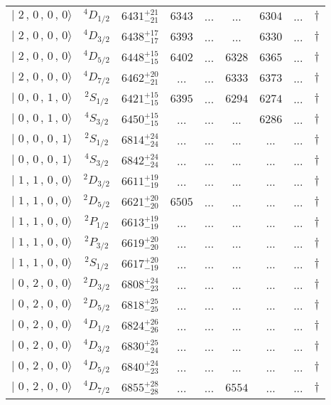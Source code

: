 \begin{tabular}{c c| c c c c c c c}
$\vert \,\,2\,,\,0\,,\,0\,,\,0 \rangle $ & $^{4}D_{1/2}$ & $6431^{+21}_{-21}$ & $6343$ & ... & ... & $6304$ & ... & $\dagger$ \\ 
$\vert \,\,2\,,\,0\,,\,0\,,\,0 \rangle $ & $^{4}D_{3/2}$ & $6438^{+17}_{-17}$ & $6393$ & ... & ... & $6330$ & ... & $\dagger$ \\ 
$\vert \,\,2\,,\,0\,,\,0\,,\,0 \rangle $ & $^{4}D_{5/2}$ & $6448^{+15}_{-15}$ & $6402$ & ... & $6328$ & $6365$ & ... & $\dagger$ \\ 
$\vert \,\,2\,,\,0\,,\,0\,,\,0 \rangle $ & $^{4}D_{7/2}$ & $6462^{+20}_{-21}$ & ... & ... & $6333$ & $6373$ & ... & $\dagger$ \\ 
$\vert \,\,0\,,\,0\,,\,1\,,\,0 \rangle $ & $^{2}S_{1/2}$ & $6421^{+15}_{-15}$ & $6395$ & ... & $6294$ & $6274$ & ... & $\dagger$ \\ 
$\vert \,\,0\,,\,0\,,\,1\,,\,0 \rangle $ & $^{4}S_{3/2}$ & $6450^{+15}_{-15}$ & ... & ... & ... & $6286$ & ... & $\dagger$ \\ 
$\vert \,\,0\,,\,0\,,\,0\,,\,1 \rangle $ & $^{2}S_{1/2}$ & $6814^{+24}_{-24}$ & ... & ... & ... & ... & ... & $\dagger$ \\ 
$\vert \,\,0\,,\,0\,,\,0\,,\,1 \rangle $ & $^{4}S_{3/2}$ & $6842^{+24}_{-24}$ & ... & ... & ... & ... & ... & $\dagger$ \\ 
$\vert \,\,1\,,\,1\,,\,0\,,\,0 \rangle $ & $^{2}D_{3/2}$ & $6611^{+19}_{-19}$ & ... & ... & ... & ... & ... & $\dagger$ \\ 
$\vert \,\,1\,,\,1\,,\,0\,,\,0 \rangle $ & $^{2}D_{5/2}$ & $6621^{+20}_{-20}$ & $6505$ & ... & ... & ... & ... & $\dagger$ \\ 
$\vert \,\,1\,,\,1\,,\,0\,,\,0 \rangle $ & $^{2}P_{1/2}$ & $6613^{+19}_{-19}$ & ... & ... & ... & ... & ... & $\dagger$ \\ 
$\vert \,\,1\,,\,1\,,\,0\,,\,0 \rangle $ & $^{2}P_{3/2}$ & $6619^{+20}_{-20}$ & ... & ... & ... & ... & ... & $\dagger$ \\ 
$\vert \,\,1\,,\,1\,,\,0\,,\,0 \rangle $ & $^{2}S_{1/2}$ & $6617^{+20}_{-19}$ & ... & ... & ... & ... & ... & $\dagger$ \\ 
$\vert \,\,0\,,\,2\,,\,0\,,\,0 \rangle $ & $^{2}D_{3/2}$ & $6808^{+24}_{-23}$ & ... & ... & ... & ... & ... & $\dagger$ \\ 
$\vert \,\,0\,,\,2\,,\,0\,,\,0 \rangle $ & $^{2}D_{5/2}$ & $6818^{+25}_{-25}$ & ... & ... & ... & ... & ... & $\dagger$ \\ 
$\vert \,\,0\,,\,2\,,\,0\,,\,0 \rangle $ & $^{4}D_{1/2}$ & $6824^{+26}_{-26}$ & ... & ... & ... & ... & ... & $\dagger$ \\ 
$\vert \,\,0\,,\,2\,,\,0\,,\,0 \rangle $ & $^{4}D_{3/2}$ & $6830^{+25}_{-24}$ & ... & ... & ... & ... & ... & $\dagger$ \\ 
$\vert \,\,0\,,\,2\,,\,0\,,\,0 \rangle $ & $^{4}D_{5/2}$ & $6840^{+24}_{-23}$ & ... & ... & ... & ... & ... & $\dagger$ \\ 
$\vert \,\,0\,,\,2\,,\,0\,,\,0 \rangle $ & $^{4}D_{7/2}$ & $6855^{+28}_{-28}$ & ... & ... & $6554$ & ... & ... & $\dagger$ \\ 
\hline \hline
\end{tabular}

